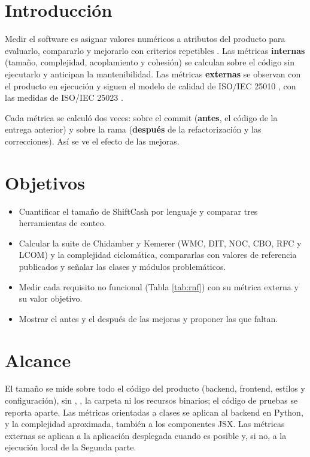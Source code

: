 \section{Introducción}

Medir el software es asignar valores numéricos a atributos del producto para evaluarlo, compararlo y mejorarlo con criterios repetibles \parencite{fenton2014}. Las métricas \textbf{internas} (tamaño, complejidad, acoplamiento y cohesión) se calculan sobre el código sin ejecutarlo y anticipan la mantenibilidad. Las métricas \textbf{externas} se observan con el producto en ejecución y siguen el modelo de calidad de ISO/IEC 25010 \parencite{iso25010}, con las medidas de ISO/IEC 25023 \parencite{iso25023}.

Cada métrica se calculó dos veces: sobre el commit  (\textbf{antes}, el código de la entrega anterior) y sobre la rama  (\textbf{después} de la refactorización y las correcciones). Así se ve el efecto de las mejoras.

\section{Objetivos}

\begin{itemize}
  \item Cuantificar el tamaño de ShiftCash por lenguaje y comparar tres herramientas de conteo.
  \item Calcular la suite de Chidamber y Kemerer (WMC, DIT, NOC, CBO, RFC y LCOM) y la complejidad ciclomática, compararlas con valores de referencia publicados y señalar las clases y módulos problemáticos.
  \item Medir cada requisito no funcional (Tabla \ref{tab:rnf}) con su métrica externa y su valor objetivo.
  \item Mostrar el antes y el después de las mejoras y proponer las que faltan.
\end{itemize}

\section{Alcance}

El tamaño se mide sobre todo el código del producto (backend, frontend, estilos y configuración), sin , , la carpeta  ni los recursos binarios; el código de pruebas se reporta aparte. Las métricas orientadas a clases se aplican al backend en Python, y la complejidad aproximada, también a los componentes JSX. Las métricas externas se aplican a la aplicación desplegada cuando es posible y, si no, a la ejecución local de la Segunda parte.

